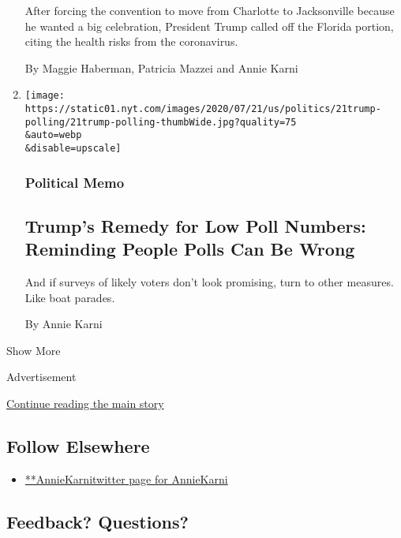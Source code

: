 \begin{enumerate}
  After forcing the convention to move from Charlotte to Jacksonville
  because he wanted a big celebration, President Trump called off the
  Florida portion, citing the health risks from the coronavirus.

  By Maggie Haberman, Patricia Mazzei and Annie Karni
\item
  \href{/2020/07/22/us/politics/trump-polls-2020.html}{}

  \texttt{[image: https://static01.nyt.com/images/2020/07/21/us/politics/21trump-polling/21trump-polling-thumbWide.jpg?quality=75\\\&auto=webp\\\&disable=upscale]}

  \hypertarget{political-memo}{%
  \subsubsection{Political Memo}\label{political-memo}}

  \hypertarget{trumps-remedy-for-low-poll-numbers-reminding-people-polls-can-be-wrong}{%
  \subsection{Trump's Remedy for Low Poll Numbers: Reminding People
  Polls Can Be
  Wrong}\label{trumps-remedy-for-low-poll-numbers-reminding-people-polls-can-be-wrong}}

  And if surveys of likely voters don't look promising, turn to other
  measures. Like boat parades.

  By Annie Karni
\end{enumerate}

Show More

Advertisement

\protect\hyperlink{after-mid2}{Continue reading the main story}

\hypertarget{follow-elsewhere}{%
\subsection{Follow Elsewhere}\label{follow-elsewhere}}

\begin{itemize}
\tightlist
\item
  \href{https://twitter.com/AnnieKarni}{**AnnieKarnitwitter page for
  AnnieKarni}
\end{itemize}

\hypertarget{feedback-questions}{%
\subsection{Feedback? Questions?}\label{feedback-questions}}

